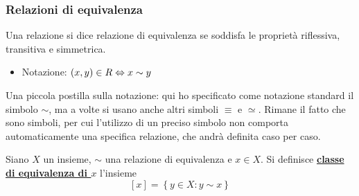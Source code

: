 \documentclass{article}     %
\begin{document}
\subsubsection{Relazioni di equivalenza}
\begin{shaded}
    \begin{definition}
        Una relazione si dice relazione di equivalenza se soddisfa le proprietà riflessiva, transitiva e simmetrica.
    \end{definition}
    \begin{itemize}
        \item Notazione: $(x,y)\in R \Leftrightarrow x\sim y$
    \end{itemize}
\end{shaded}
Una piccola postilla sulla notazione: qui ho specificato come notazione standard il simbolo $\sim$, ma a volte si usano anche altri simboli $\equiv$ e $\simeq$. Rimane il fatto che sono simboli, per cui l'utilizzo di un preciso simbolo non comporta automaticamente una specifica relazione, che andrà definita caso per caso.
\begin{shaded}
    \begin{definition}
        Siano $X$ un insieme, $\sim$ una relazione di equivalenza e $x\in X$. Si definisce \underline{\textbf{classe di equivalenza di $x$}} l’insieme \[\displaystyle [x] = \left\{y\in X : y\sim x\right\}\]
    \end{definition}
\end{shaded}
\end{document}
